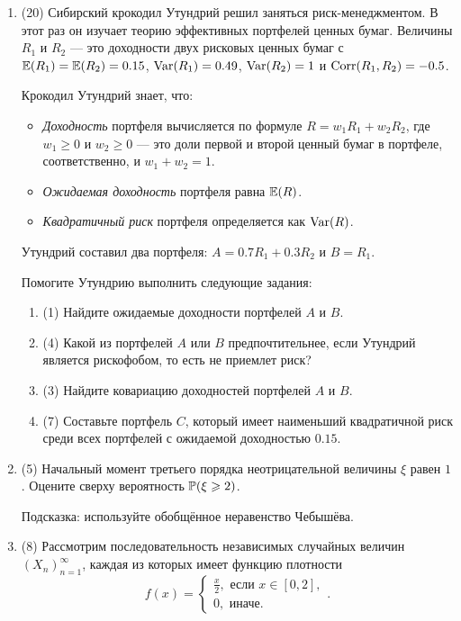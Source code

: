 \begin{enumerate}
  \item 
   (20) Сибирский крокодил Утундрий решил заняться риск-менеджментом. 
	 В этот раз он изучает теорию эффективных портфелей ценных бумаг. 
	 Величины $R_1$ и $R_2$ — это доходности двух рисковых ценных бумаг с 
	 $\E(R_1) = \E(R_2) = 0.15$, $\Var(R_1) = 0.49$, $\Var(R_2)=1$ и  $\Corr(R_1, R_2) = -0.5$.
	
	Крокодил Утундрий знает, что: 
	\begin{itemize}
	\item \textit{Доходность} портфеля вычисляется по формуле $R=w_1 R_1+w_2 R_2$, где $w_1 \geq 0$ и $w_2 \geq 0$ — это доли первой и второй ценный бумаг в портфеле, соответственно, и $w_1 + w_2 = 1$.
	\item \textit{Ожидаемая доходность} портфеля равна $\E(R)$.
	\item \textit{Квадратичный риск} портфеля определяется как $\Var(R)$.
	\end{itemize}

	Утундрий составил два портфеля: $A=0.7 R_1+0.3 R_2$ и $B=R_1$. 
	
	Помогите Утундрию выполнить следующие задания:
	 \begin{enumerate}
	\item (1) Найдите ожидаемые доходности портфелей $A$ и $B$.
	\item (4) Какой из портфелей $A$ или $B$ предпочтительнее, если Утундрий является рискофобом, то есть не приемлет риск?
	\item (3) Найдите ковариацию доходностей портфелей $A$ и $B$.
	\item (7) Составьте портфель $C$, который имеет наименьший квадратичной риск среди всех портфелей с ожидаемой доходностью $0.15$.
	\end{enumerate}
   
  \item  (5) Начальный момент третьего порядка неотрицательной величины $\xi$ равен $1$. 
  Оцените сверху вероятность $\P(\xi \geq 2)$.
  
  Подсказка: используйте обобщённое неравенство Чебышёва.
  
  
  \item (8) Рассмотрим последовательность независимых случайных величин $(X_n)_{n=1}^{\infty}$, каждая из которых имеет функцию плотности
  \[
  f(x)=\begin{cases}
  \frac{x}{2}, \text{ если } x \in [0, 2], \\
  0, \text{ иначе. }
  \end{cases}.
  \]
  

\end{enumerate}
